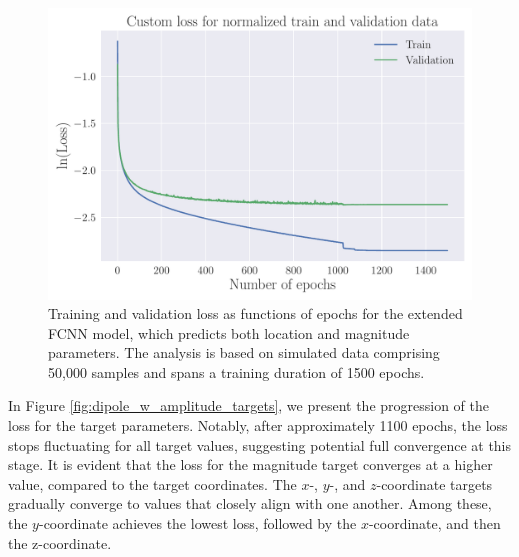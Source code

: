 \documentclass[a4paper, UKenglish, 11pt]{uiomaster}
\begin{document}
\begin{figure}[!htb]
    \centering
    \includegraphics[width=\linewidth]{figures/NN_magnitude/Custom_Loss_amplitudes_test_custom_loss_tanh_32_0.001_0.35_0.1_0_1500_(0).pdf}
    \caption{Training and validation loss as functions of epochs for the extended FCNN model, which predicts both location and magnitude parameters. The analysis is based on simulated data comprising 50,000 samples and spans a training duration of 1500 epochs.}
    \label{fig:dipole_w_amplitude_loss}
\end{figure}

In Figure \ref{fig:dipole_w_amplitude_targets}, we present the progression of the loss for the target parameters. Notably, after approximately 1100 epochs, the loss stops fluctuating for all target values, suggesting potential full convergence at this stage. It is evident that the loss for the magnitude target converges at a higher value, compared to the target coordinates. The $x$-, $y$-, and $z$-coordinate targets gradually converge to values that closely align with one another. Among these, the $y$-coordinate achieves the lowest loss, followed by the $x$-coordinate, and then the z-coordinate.
\end{document}
